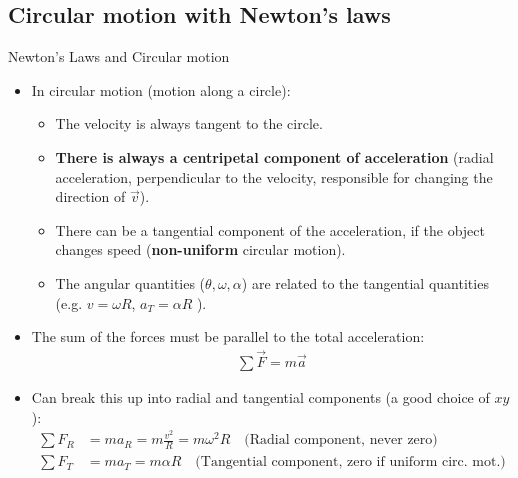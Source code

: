 \documentclass[aspectratio=169,
hyperref={colorlinks,urlcolor=blue}
]{beamer}
\begin{document}
\subsection{Circular motion with Newton's laws}
\label{subsec:circularmotionwithnewtonslaws}
\begin{frame}{Newton’s Laws and Circular motion}
\begin{itemize}
\item In circular motion (motion along a circle):
\begin{itemize}
\item The velocity is always tangent to the circle.
\item \textbf{There is always a centripetal component of acceleration} (radial acceleration, perpendicular to the velocity, responsible for changing the direction of $\vec v$).
\item There can be a tangential component of the acceleration, if the object changes speed (\textbf{non-uniform} circular motion).
\item The angular quantities ($\theta,\omega,\alpha$) are related to the tangential quantities (e.g. $v=\omega R$, $a_T=\alpha R$ ).
\end{itemize}
\item The sum of the forces must be parallel to the total acceleration:
\begin{align*}
\sum \vec F=m\vec a
\end{align*}
\item Can break this up into radial and tangential components (a good choice of $xy$):
\begin{align*}
\sum F_R&=ma_R=m\frac{v^2}{R}=m\omega^2R\quad \text{(Radial component, never zero)}\\
\sum F_T&=ma_T=m\alpha R\quad \text{(Tangential component, zero if uniform circ. mot.)}
\end{align*}
\end{itemize}
\end{frame}



\end{document}
